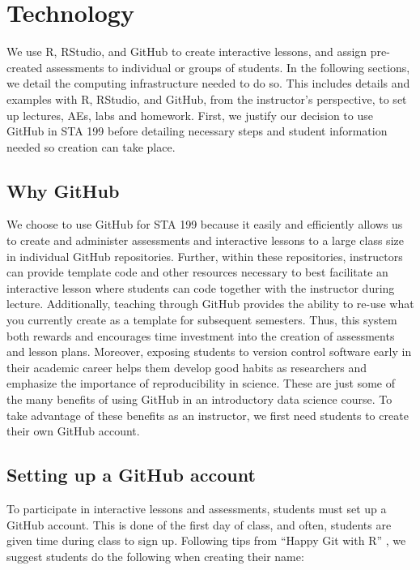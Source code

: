 \documentclass[
  12pt]{article}
\begin{document}
\hypertarget{sec-tech}{%
\section{Technology}\label{sec-tech}}

We use R, RStudio, and GitHub to create interactive lessons, and assign
pre-created assessments to individual or groups of students. In the
following sections, we detail the computing infrastructure needed to do
so. This includes details and examples with R, RStudio, and GitHub, from
the instructor's perspective, to set up lectures, AEs, labs and
homework. First, we justify our decision to use GitHub in STA 199 before
detailing necessary steps and student information needed so creation can
take place.

\hypertarget{why-github}{%
\subsection{Why GitHub}\label{why-github}}

We choose to use GitHub for STA 199 because it easily and efficiently
allows us to create and administer assessments and interactive lessons
to a large class size in individual GitHub repositories. Further, within
these repositories, instructors can provide template code and other
resources necessary to best facilitate an interactive lesson where
students can code together with the instructor during lecture.
Additionally, teaching through GitHub provides the ability to re-use
what you currently create as a template for subsequent semesters. Thus,
this system both rewards and encourages time investment into the
creation of assessments and lesson plans. Moreover, exposing students to
version control software early in their academic career helps them
develop good habits as researchers and emphasize the importance of
reproducibility in science. These are just some of the many benefits of
using GitHub in an introductory data science course. To take advantage
of these benefits as an instructor, we first need students to create
their own GitHub account.

\hypertarget{setting-up-a-github-account}{%
\subsection{Setting up a GitHub
account}\label{setting-up-a-github-account}}

To participate in interactive lessons and assessments, students must set
up a GitHub account. This is done of the first day of class, and often,
students are given time during class to sign up. Following tips from
``Happy Git with R'' \citep{bryan_hester_2020}, we suggest students do
the following when creating their name:
\end{document}
